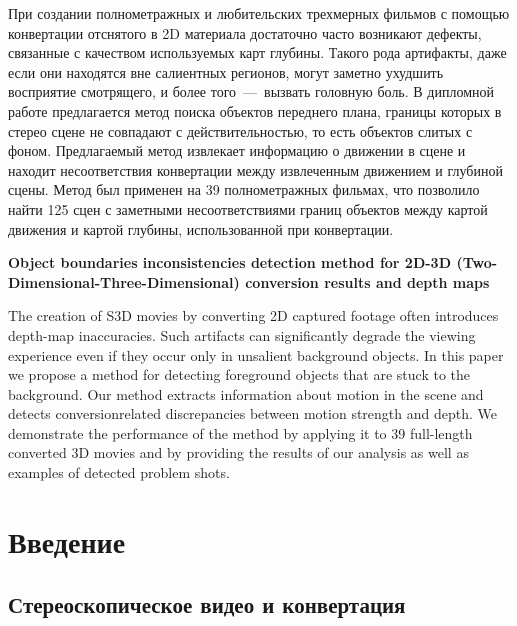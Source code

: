 \documentclass[12pt, a4paper]{article}
\begin{document}
При создании полнометражных и любительских трехмерных фильмов с помощью 
конвертации отснятого в 2D материала достаточно часто возникают дефекты, 
связанные с качеством используемых карт глубины. Такого рода артифакты, 
даже если они находятся вне салиентных регионов,  могут заметно ухудшить 
восприятие смотрящего, и более того~---~вызвать головную боль. В дипломной
работе предлагается метод поиска объектов переднего плана, границы которых 
в стерео сцене не совпадают с действительностью, то есть объектов слитых 
с фоном. Предлагаемый метод извлекает информацию о движении в сцене и 
находит несоответствия конвертации между извлеченным движением и глубиной сцены.
Метод был применен на 39 полнометражных фильмах, что позволило найти 125 сцен с заметными несоответствиями границ объектов между картой движения и картой глубины, 
использованной при конвертации.

\vspace{2cm}

\textbf{Object boundaries inconsistencies detection method 
for 2D-3D (Two-Dimensional-Three-Dimensional)
conversion results and depth maps}

\vspace{0.5cm}

The creation of S3D movies by converting 2D captured footage
often introduces depth-map inaccuracies. Such artifacts can
significantly degrade the viewing experience even if they occur
only in unsalient background objects.
In this paper we propose a method for detecting foreground
objects that are stuck to the background. Our method extracts
information about motion in the scene and detects conversionrelated
discrepancies between motion strength and depth. We
demonstrate the performance of the method by applying it
to 39 full-length converted 3D movies and by providing the
results of our analysis as well as examples of detected problem
shots.

\newpage
{}
\tableofcontents

\newpage
\section{Введение}

\subsection{Стереоскопическое видео и конвертация}
\end{document}
